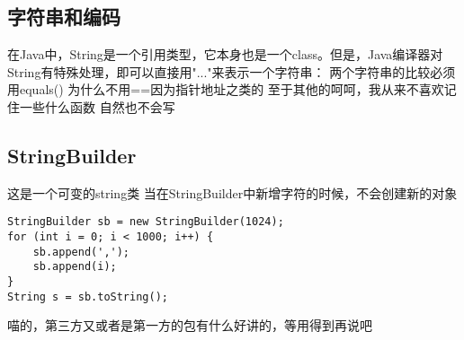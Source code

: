 \documentclass[a4paper,12pt]{ctexbook}
\begin{document}
\subsection{字符串和编码}
在Java中，String是一个引用类型，它本身也是一个class。但是，Java编译器对String有特殊处理，即可以直接用"..."来表示一个字符串：
两个字符串的比较必须用equals() 为什么不用==因为指针地址之类的
至于其他的呵呵，我从来不喜欢记住一些什么函数 自然也不会写
\subsection{StringBuilder}
这是一个可变的string类 当在StringBuilder中新增字符的时候，不会创建新的对象
\begin{lstlisting}
StringBuilder sb = new StringBuilder(1024);
for (int i = 0; i < 1000; i++) {
    sb.append(',');
    sb.append(i);
}
String s = sb.toString();
\end{lstlisting}
喵的，第三方又或者是第一方的包有什么好讲的，等用得到再说吧
\end{document}
